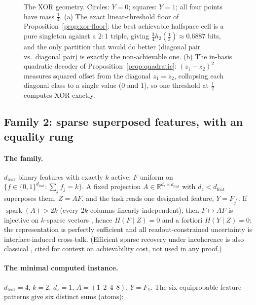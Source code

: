 \documentclass[twocolumn,10pt]{article}
\theoremstyle{definition}
\theoremstyle{remark}
\newcommand{\R}{\mathbb{R}}
\newcommand{\dfeat}{d_{\mathrm{feat}}}
\newcommand{\dz}{d_z}
\begin{document}
\begin{figure}[t]
\caption{The XOR geometry. Circles: $Y = 0$; squares: $Y = 1$; all four
points have mass $\tfrac14$. (a) The exact linear-threshold floor of
Proposition~\ref{prop:xor-floor}: the best achievable halfspace cell is a
pure singleton against a $2{:}1$ triple, giving
$\tfrac34 h_2(\tfrac13) \approx 0.6887$ bits, and the only partition that
would do better (diagonal pair vs.\ diagonal pair) is exactly the
non-achievable one. (b) The in-basis quadratic decoder of
Proposition~\ref{prop:quadratic}: $(z_1 - z_2)^2$ measures squared
offset from the diagonal $z_1 = z_2$, collapsing each diagonal class to
a single value ($0$ and $1$), so one threshold at $\tfrac12$ computes
XOR exactly.}
\label{fig:xor-geometry}
\end{figure}

\subsection{Family 2: sparse superposed features, with an equality rung}
\label{sec:superposition}

\paragraph{The family.} $\dfeat$ binary features with exactly $k$ active:
$F$ uniform on $\{f \in \{0,1\}^{\dfeat} : \sum_j f_j = k\}$. A fixed
projection $A \in \R^{\dz \times \dfeat}$ with $\dz < \dfeat$ superposes
them, $Z = AF$, and the task reads one designated feature, $Y = F_{j^*}$.
If $\operatorname{spark}(A) > 2k$ (every $2k$ columns linearly
independent), then $F \mapsto AF$ is injective on $k$-sparse vectors
\cite{donohoelad}, hence $H(F \mid Z) = 0$ and a fortiori
$H(Y \mid Z) = 0$: the representation is perfectly sufficient and all
readout-constrained uncertainty is interface-induced cross-talk. (Efficient
sparse recovery under incoherence is also classical \cite{tropp}, cited for
context on achievability cost, not used in any proof.)

\paragraph{The minimal computed instance.} $\dfeat = 4$, $k = 2$,
$\dz = 1$, $A = (1\;\,2\;\,4\;\,8)$, $Y = F_1$. The six equiprobable
feature patterns give six distinct sums (atoms):
\end{document}
